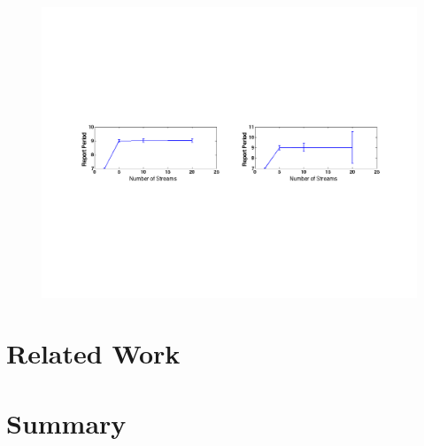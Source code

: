 \begin{figure}[t!] %
\centering
\includegraphics[width=1.0	\columnwidth]{figs/period_vs_streams}
\caption{}
\label{fig:report_periods}
\end{figure}

\section{Related Work}


\section{Summary}






